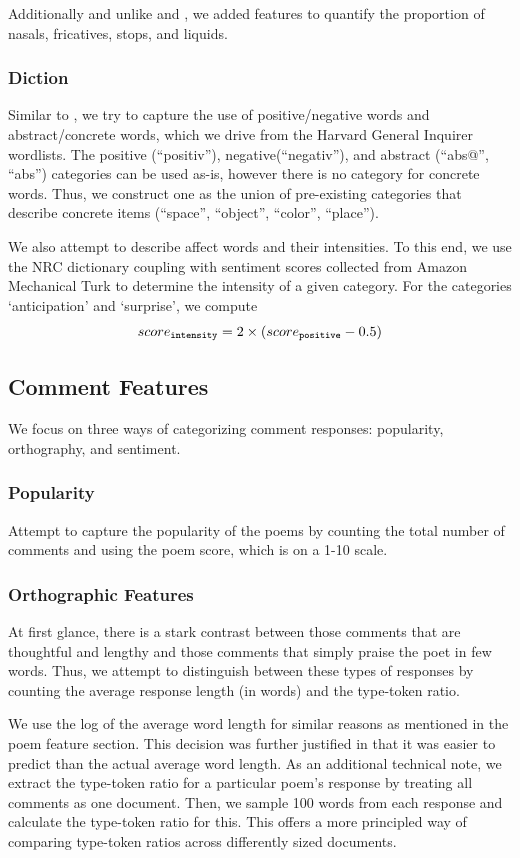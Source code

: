 \documentclass[11pt]{article}
\begin{document}
Additionally and unlike  and , we added features to quantify the proportion of nasals, fricatives, stops, and liquids. 

\subsubsection{Diction}
Similar to \cite{kao2012computational}, we try to capture the use of positive/negative words and abstract/concrete words, which we drive from the Harvard General Inquirer wordlists. The positive (``positiv''), negative(``negativ''), and abstract (``abs@'', ``abs'') categories can be used as-is, however there is no category for concrete words. Thus, we construct one as the union of pre-existing categories that describe concrete items (``space'', ``object'', ``color'', ``place'').

We also attempt to describe affect words and their intensities. To this end, we use the NRC dictionary coupling with sentiment scores collected from Amazon Mechanical Turk to determine the intensity of a given category. For the categories `anticipation’ and `surprise’, we compute 
$$score_{\tt intensity} = 2 \times ( score_{\tt positive} - 0.5 )$$

\subsection{Comment Features}
We focus on three ways of categorizing comment responses: popularity, orthography, and sentiment.

\subsubsection{Popularity}
Attempt to capture the popularity of the poems by counting the total number of comments and using the poem score, which is on a 1-10 scale.

\subsubsection{Orthographic Features}
At first glance, there is a stark contrast between those comments that are thoughtful and lengthy and those comments that simply praise the poet in few words. Thus, we attempt to distinguish between these types of responses by counting the average response length (in words) and the type-token ratio. 

We use the log of the average word length for similar reasons as mentioned in the poem feature section. This decision was further justified in that it was easier to predict than the actual average word length. As an additional technical note, we extract the type-token ratio for a particular poem's response by treating all comments as one document. Then, we sample 100 words from each response and calculate the type-token ratio for this. This offers a more principled way of comparing type-token ratios across differently sized documents.
\end{document}
